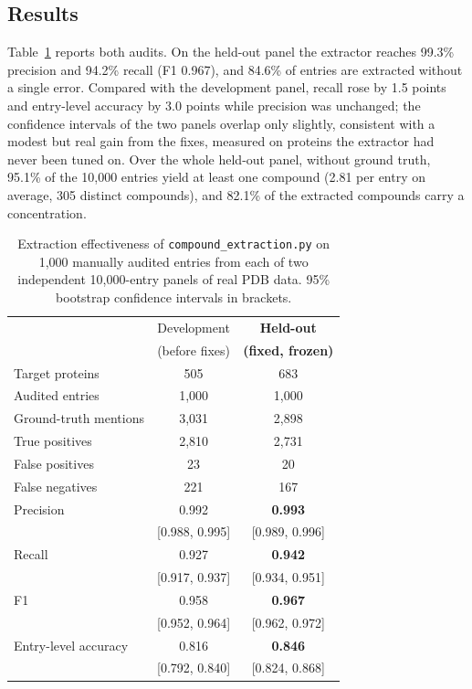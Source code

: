 \subsection{Results}

Table~\ref{tab:heldout} reports both audits. On the held-out panel the
extractor reaches 99.3\% precision and 94.2\% recall (F1 0.967), and
84.6\% of entries are extracted without a single error. Compared with
the development panel, recall rose by 1.5 points and entry-level
accuracy by 3.0 points while precision was unchanged; the confidence
intervals of the two panels overlap only slightly, consistent with a
modest but real gain from the fixes, measured on proteins the extractor
had never been tuned on. Over the whole held-out panel, without ground
truth, 95.1\% of the 10{,}000 entries yield at least one compound
(2.81 per entry on average, 305 distinct compounds), and 82.1\% of the
extracted compounds carry a concentration.

\begin{table}[t]
\centering
\caption{Extraction effectiveness of \texttt{compound\_extraction.py} on
1{,}000 manually audited entries from each of two independent
10{,}000-entry panels of real PDB data. 95\% bootstrap confidence
intervals in brackets.}
\label{tab:heldout}
\setlength{\tabcolsep}{4pt}
\begin{tabular}{lcc}
\toprule
 & Development & \textbf{Held-out} \\
 & (before fixes) & \textbf{(fixed, frozen)} \\
\midrule
Target proteins & 505 & 683 \\
Audited entries & 1{,}000 & 1{,}000 \\
Ground-truth mentions & 3{,}031 & 2{,}898 \\
True positives & 2{,}810 & 2{,}731 \\
False positives & 23 & 20 \\
False negatives & 221 & 167 \\
\midrule
Precision & 0.992 & \textbf{0.993} \\
 & {\footnotesize[0.988, 0.995]} & {\footnotesize[0.989, 0.996]} \\
Recall & 0.927 & \textbf{0.942} \\
 & {\footnotesize[0.917, 0.937]} & {\footnotesize[0.934, 0.951]} \\
F1 & 0.958 & \textbf{0.967} \\
 & {\footnotesize[0.952, 0.964]} & {\footnotesize[0.962, 0.972]} \\
Entry-level accuracy & 0.816 & \textbf{0.846} \\
 & {\footnotesize[0.792, 0.840]} & {\footnotesize[0.824, 0.868]} \\
\bottomrule
\end{tabular}
\end{table}

